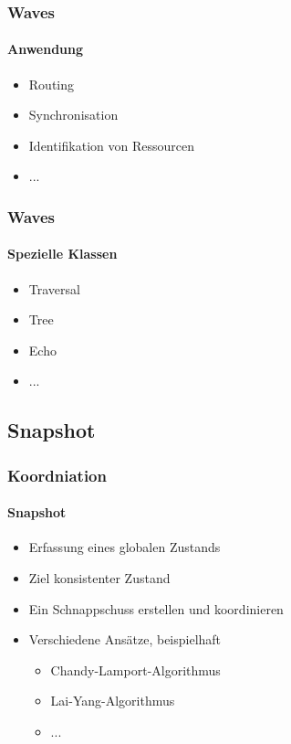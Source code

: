 \begin{frame}
  \frametitle{Waves}
  \framesubtitle{Anwendung}
  \begin{itemize}
     \item Routing
     \item Synchronisation
     \item Identifikation von Ressourcen
     \item ...
  \end{itemize}
\end{frame}

\begin{frame}
  \frametitle{Waves}
  \framesubtitle{Spezielle Klassen}
  \begin{itemize}
     \item Traversal
     \item Tree
     \item Echo 
     \item ...
  \end{itemize}
\end{frame}

\subsection{Snapshot}
\begin{frame}
  \frametitle{Koordniation}
  \framesubtitle{Snapshot}
  \begin{itemize}
    \item Erfassung eines globalen Zustands
    \item Ziel konsistenter Zustand
    \item Ein Schnappschuss erstellen und koordinieren
    \item Verschiedene Ansätze, beispielhaft
     \begin{itemize}
      \item Chandy-Lamport-Algorithmus
      \item Lai-Yang-Algorithmus
      \item ...
     \end{itemize}
  \end{itemize}
\end{frame}


